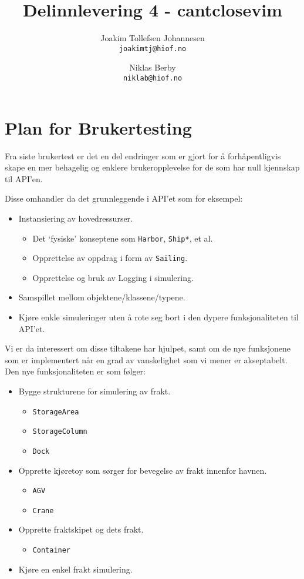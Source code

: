 \documentclass[12pt]{article}
\title{Delinnlevering 4 - cantclosevim}
\author{
    Joakim Tollefsen Johannesen\\
    \texttt{joakimtj@hiof.no}
    \and
    Niklas Berby\\
    \texttt{niklab@hiof.no}
}
\begin{document}
\maketitle

\newpage
\section{Plan for Brukertesting}
Fra siste brukertest er det en del endringer som er gjort for å forhåpentligvis skape en mer behagelig og enklere brukeropplevelse for de som
har null kjennskap til API'en.

Disse omhandler da det grunnleggende i API'et som for eksempel:
\begin{itemize}
    \item Instansiering av hovedressurser.
        \begin{itemize}
            \item Det `fysiske' konseptene som \texttt{Harbor}, \texttt{Ship*}, et al.
            \item Opprettelse av oppdrag i form av \texttt{Sailing}.
            \item Opprettelse og bruk av Logging i simulering.
        \end{itemize}
    \item Samspillet mellom objektene/klassene/typene.
    \item Kjøre enkle simuleringer uten å rote seg bort i den dypere funksjonaliteten til API'et.
\end{itemize}

Vi er da interessert om disse tiltakene har hjulpet, samt om de nye funksjonene som er implementert når en grad av vanskelighet som vi mener er
akseptabelt.
Den nye funksjonaliteten er som følger:
\begin{itemize}
    \item Bygge strukturene for simulering av frakt.
    \begin{itemize}
        \item \texttt{StorageArea}
        \item \texttt{StorageColumn}
        \item \texttt{Dock}
    \end{itemize}
    \item Opprette kjøretoy som sørger for bevegelse av frakt innenfor havnen.
    \begin{itemize}
        \item \texttt{AGV}
        \item \texttt{Crane}
    \end{itemize}
    \item Opprette fraktskipet og dets frakt.
    \begin{itemize}
        \item \texttt{Container}
    \end{itemize}
    \item Kjøre en enkel frakt simulering.
\end{itemize}
\end{document}
